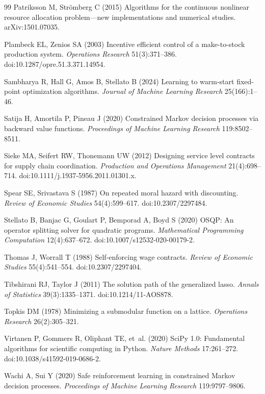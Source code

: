 \documentclass[11pt,letterpaper]{article}
\theoremstyle{definition}
\newcommand{\1}{\mathbf 1}
\begin{document}
\begin{thebibliography}{99}
Patriksson M, Str\"omberg C (2015) Algorithms for the continuous nonlinear resource allocation problem---new implementations and numerical studies. arXiv:1501.07035.

Plambeck EL, Zenios SA (2003) Incentive efficient control of a make-to-stock production system. \emph{Operations Research} 51(3):371--386. doi:10.1287/opre.51.3.371.14954.

Sambharya R, Hall G, Amos B, Stellato B (2024) Learning to warm-start fixed-point optimization algorithms. \emph{Journal of Machine Learning Research} 25(166):1--46.

Satija H, Amortila P, Pineau J (2020) Constrained Markov decision processes via backward value functions. \emph{Proceedings of Machine Learning Research} 119:8502--8511.

Sieke MA, Seifert RW, Thonemann UW (2012) Designing service level contracts for supply chain coordination. \emph{Production and Operations Management} 21(4):698--714. doi:10.1111/j.1937-5956.2011.01301.x.

Spear SE, Srivastava S (1987) On repeated moral hazard with discounting. \emph{Review of Economic Studies} 54(4):599--617. doi:10.2307/2297484.

Stellato B, Banjac G, Goulart P, Bemporad A, Boyd S (2020) OSQP: An operator splitting solver for quadratic programs. \emph{Mathematical Programming Computation} 12(4):637--672. doi:10.1007/s12532-020-00179-2.

Thomas J, Worrall T (1988) Self-enforcing wage contracts. \emph{Review of Economic Studies} 55(4):541--554. doi:10.2307/2297404.

Tibshirani RJ, Taylor J (2011) The solution path of the generalized lasso. \emph{Annals of Statistics} 39(3):1335--1371. doi:10.1214/11-AOS878.

Topkis DM (1978) Minimizing a submodular function on a lattice. \emph{Operations Research} 26(2):305--321.



Virtanen P, Gommers R, Oliphant TE, et~al. (2020) SciPy 1.0: Fundamental algorithms for scientific computing in Python. \emph{Nature Methods} 17:261--272. doi:10.1038/s41592-019-0686-2.

Wachi A, Sui Y (2020) Safe reinforcement learning in constrained Markov decision processes. \emph{Proceedings of Machine Learning Research} 119:9797--9806.


\end{thebibliography}

\end{document}
